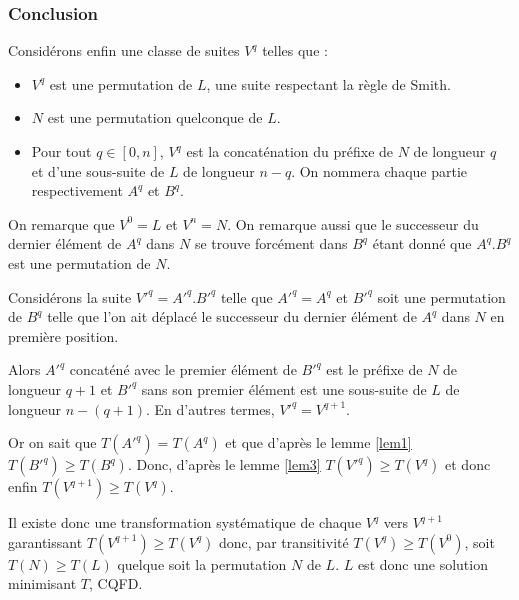 \subsubsection{Conclusion}
Considérons enfin une classe de suites $V^q$ telles que :
\begin{itemize}
\item $V^q$ est une permutation de $L$, une suite respectant la règle de Smith.
\item $N$ est une permutation quelconque de $L$.
\item Pour tout $q\in[0,n]$, $V^q$ est la concaténation du préfixe de $N$ de 
longueur $q$ et d'une sous-suite de $L$ de longueur $n-q$. On nommera chaque 
partie respectivement $A^q$ et $B^q$.
\end{itemize}
On remarque que $V^0=L$ et $V^n=N$. On remarque aussi que le successeur du 
dernier élément de $A^q$ dans $N$ se trouve forcément dans $B^q$ étant donné que 
$A^q.B^q$ est une permutation de $N$.

Considérons la suite $V'^q=A'^q.B'^q$ telle que $A'^q=A^q$ et $B'^q$ soit une 
permutation de $B^q$ telle que l'on ait déplacé le successeur du dernier élément 
de $A^q$ dans $N$ en première position.

Alors $A'^q$ concaténé avec le premier élément de $B'^q$ est le préfixe de $N$ 
de longueur $q+1$ et $B'^q$ sans son premier élément est une sous-suite de $L$ 
de longueur $n-(q+1)$. En d'autres termes, $V'^q=V^{q+1}$.

Or on sait que $T(A'^q)=T(A^q)$ et que d'après le lemme \ref{lem1} $T(B'^q)\geq 
T(B^q)$.  Donc, d'après le lemme \ref{lem3} $T(V'^q)\geq T(V^q)$ et donc enfin 
$T(V^{q+1}) \geq T(V^q)$.

Il existe donc une transformation systématique de chaque $V^q$ vers $V^{q+1}$ 
garantissant $T(V^{q+1}) \geq T(V^q)$ donc, par transitivité $T(V^q) \geq 
T(V^0)$, soit $T(N) \geq T(L)$ quelque soit la permutation $N$ de $L$. $L$ est 
donc une solution minimisant $T$, CQFD.
